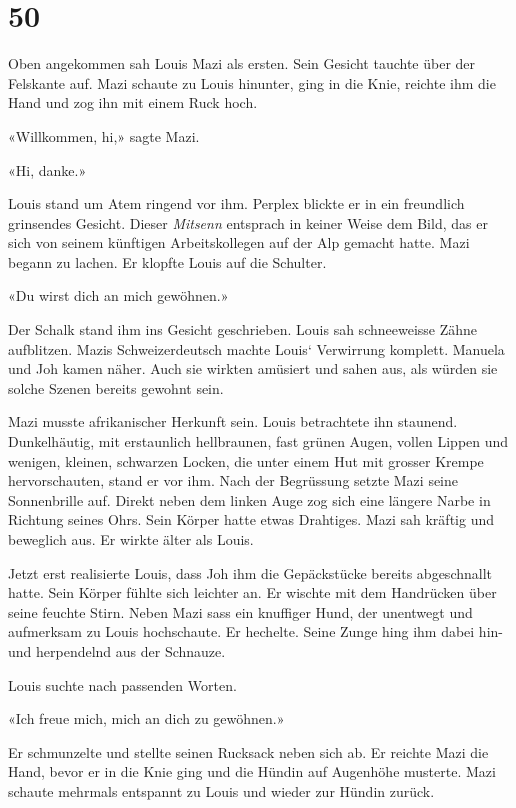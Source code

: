 \chapter{50}\label{section-50}

Oben angekommen sah Louis Mazi als ersten. Sein Gesicht tauchte über der
Felskante auf. Mazi schaute zu Louis hinunter, ging in die Knie, reichte
ihm die Hand und zog ihn mit einem Ruck hoch.

«Willkommen, hi,» sagte Mazi.

«Hi, danke.»

Louis stand um Atem ringend vor ihm. Perplex blickte er in ein
freundlich grinsendes Gesicht. Dieser \emph{Mitsenn} entsprach in keiner
Weise dem Bild, das er sich von seinem künftigen Arbeitskollegen auf der
Alp gemacht hatte. Mazi begann zu lachen. Er klopfte Louis auf die
Schulter.

«Du wirst dich an mich gewöhnen.»

Der Schalk stand ihm ins Gesicht geschrieben. Louis sah schneeweisse
Zähne aufblitzen. Mazis Schweizerdeutsch machte Louis` Verwirrung
komplett. Manuela und Joh kamen näher. Auch sie wirkten amüsiert und
sahen aus, als würden sie solche Szenen bereits gewohnt sein.

Mazi musste afrikanischer Herkunft sein. Louis betrachtete ihn staunend.
Dunkelhäutig, mit erstaunlich hellbraunen, fast grünen Augen, vollen
Lippen und wenigen, kleinen, schwarzen Locken, die unter einem Hut mit
grosser Krempe hervorschauten, stand er vor ihm. Nach der Begrüssung
setzte Mazi seine Sonnenbrille auf. Direkt neben dem linken Auge zog
sich eine längere Narbe in Richtung seines Ohrs. Sein Körper hatte etwas
Drahtiges. Mazi sah kräftig und beweglich aus. Er wirkte älter als
Louis.

Jetzt erst realisierte Louis, dass Joh ihm die Gepäckstücke bereits
abgeschnallt hatte. Sein Körper fühlte sich leichter an. Er wischte mit
dem Handrücken über seine feuchte Stirn. Neben Mazi sass ein knuffiger
Hund, der unentwegt und aufmerksam zu Louis hochschaute. Er hechelte.
Seine Zunge hing ihm dabei hin- und herpendelnd aus der Schnauze.

Louis suchte nach passenden Worten.

«Ich freue mich, mich an dich zu gewöhnen.»

Er schmunzelte und stellte seinen Rucksack neben sich ab. Er reichte
Mazi die Hand, bevor er in die Knie ging und die Hündin auf Augenhöhe
musterte. Mazi schaute mehrmals entspannt zu Louis und wieder zur Hündin
zurück.

